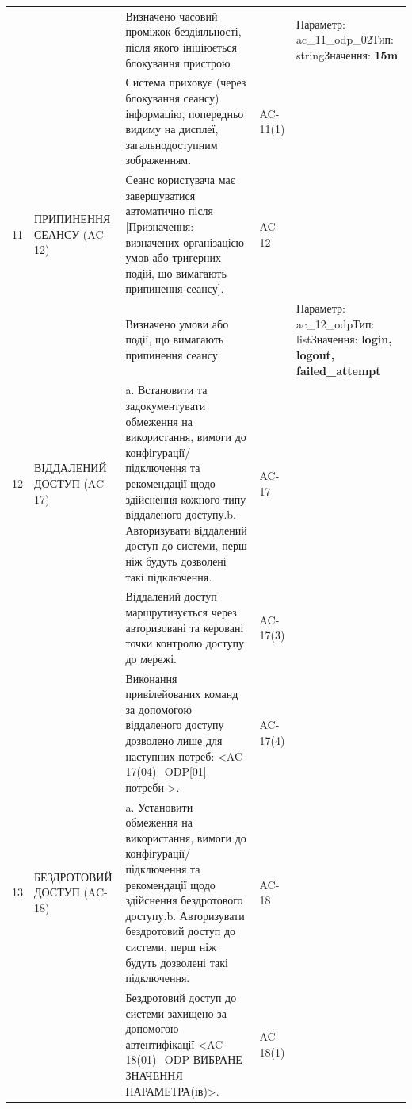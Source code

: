 \documentclass[10pt]{article}
\begin{document}
\begin{longtable}{|c|>{\raggedright\arraybackslash}p{4cm}|>{\raggedright\arraybackslash}p{6cm}|>{\raggedright\arraybackslash}p{1.5cm}|>{\raggedright\arraybackslash}p{3.5cm}|}
 &  & Визначено часовий проміжок бездіяльності, після якого ініціюється блокування пристрою &  & Параметр: ac\_\allowbreak{}11\_\allowbreak{}odp\_\allowbreak{}02\newline Тип: string\newline Значення: \textbf{15m} \\ \cline{3-5}
 &  & Система приховує (через блокування сеансу) інформацію, попередньо видиму на дисплеї, загальнодоступним зображенням.\newline  & AC-11(1) & \\ \hline
11 & ПРИПИНЕННЯ СЕАНСУ (AC-12) & Сеанс користувача має завершуватися автоматично після [Призначення: визначених організацією умов або тригерних подій, що вимагають припинення сеансу]. & AC-12 & \\ \cline{3-5}
 &  & Визначено умови або події, що вимагають припинення сеансу &  & Параметр: ac\_\allowbreak{}12\_\allowbreak{}odp\newline Тип: list\newline Значення: \textbf{login, logout, failed\_\allowbreak{}attempt} \\ \hline
12 & ВІДДАЛЕНИЙ ДОСТУП (AC-17) & a. Встановити та задокументувати обмеження на використання, вимоги до конфігурації/підключення та рекомендації щодо здійснення кожного типу віддаленого доступу.\newline b. Авторизувати віддалений доступ до системи, перш ніж будуть дозволені такі підключення. & AC-17 & \\ \cline{3-5}
 &  & Віддалений доступ маршрутизується через авторизовані та керовані точки контролю доступу до мережі.\newline  & AC-17(3) & \\ \cline{3-5}
 &  & Виконання привілейованих команд за допомогою віддаленого доступу дозволено лише для наступних потреб: <AC-17(04)\_\allowbreak{}ODP[01] потреби >.\newline  & AC-17(4) & \\ \hline
13 & БЕЗДРОТОВИЙ ДОСТУП (AC-18) & a. Установити обмеження на використання, вимоги до конфігурації/підключення та рекомендації щодо здійснення бездротового доступу.\newline b. Авторизувати бездротовий доступ до системи, перш ніж будуть дозволені такі підключення. & AC-18 & \\ \cline{3-5}
 &  & Бездротовий доступ до системи захищено за допомогою автентифікації <AC-18(01)\_\allowbreak{}ODP ВИБРАНЕ ЗНАЧЕННЯ ПАРАМЕТРА(ів)>.\newline  & AC-18(1) & \\ \cline{3-5}

\end{longtable}
\end{document}
